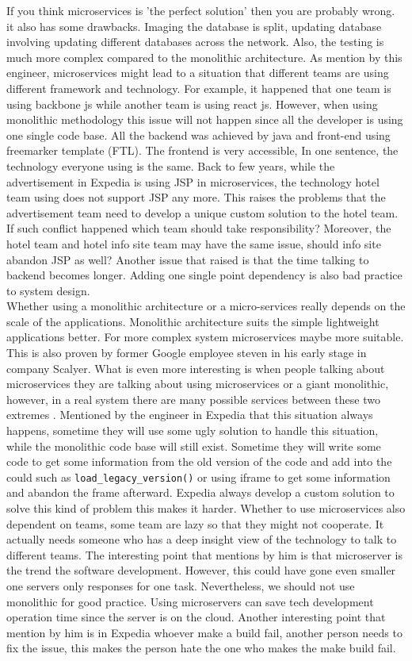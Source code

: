 \documentclass[11pt]{article}
\begin{document}
If you think microservices is 'the perfect solution' then you are probably wrong. it also has some drawbacks. Imaging the database is split, updating database involving updating different databases across the network. Also, the testing is much more complex compared to the monolithic architecture. As mention by this engineer, microservices might lead to a situation that different teams are using different framework and technology. For example, it happened that one team is using backbone js while another team is using react js. However, when using monolithic methodology this issue will not happen since all the developer is using one single code base. All the backend was achieved by java and front-end using freemarker template (FTL). The frontend is very accessible, In one sentence, the technology everyone using is the same. Back to few years, while the advertisement in Expedia is using JSP in microservices, the technology hotel team using does not support JSP any more. This raises the problems that the advertisement team need to develop a unique custom solution to the hotel team. If such conflict happened which team should take responsibility? Moreover, the hotel team and hotel info site team may have the same issue, should info site abandon JSP as well? Another issue that raised is that the time talking to backend becomes longer. Adding one single point dependency is also bad practice to system design. \\[10px]
Whether using a monolithic architecture or a micro-services really depends on the scale of the applications. 
Monolithic architecture suits the simple lightweight applications better. 
For more complex system microservices maybe more suitable. 
This is also proven by former Google employee steven in his early stage in company Scalyer. 
What is even more interesting is when people talking about microservices they are talking about 
using microservices or a giant monolithic, however, in a real system there are many possible services 
between these two extremes \cite{no9}. Mentioned by the engineer in Expedia that this situation always happens, 
sometime they will use some ugly solution to handle this situation, while the monolithic code base will still exist. 
Sometime they will write some code to get some information from the old version of the code and add into the could 
such as \texttt{load\_legacy\_version()} or using iframe to get some information and abandon the frame afterward. 
Expedia always develop a custom solution to solve this kind of problem this makes it harder. 
Whether to use microservices also dependent on teams, some team are lazy so that they might not cooperate. It actually needs someone who has a deep insight view of the technology to talk to different teams. The interesting point that mentions by him is that microserver is the trend the software development. However, this could have gone even smaller one servers only responses for one task. Nevertheless, we should not use monolithic for good practice. Using microservers can save tech development operation time since the server is on the cloud.  Another interesting point that mention by him is in Expedia whoever make a build fail, another person needs to fix the issue, this makes the person hate the one who makes the make build fail.
\end{document}
